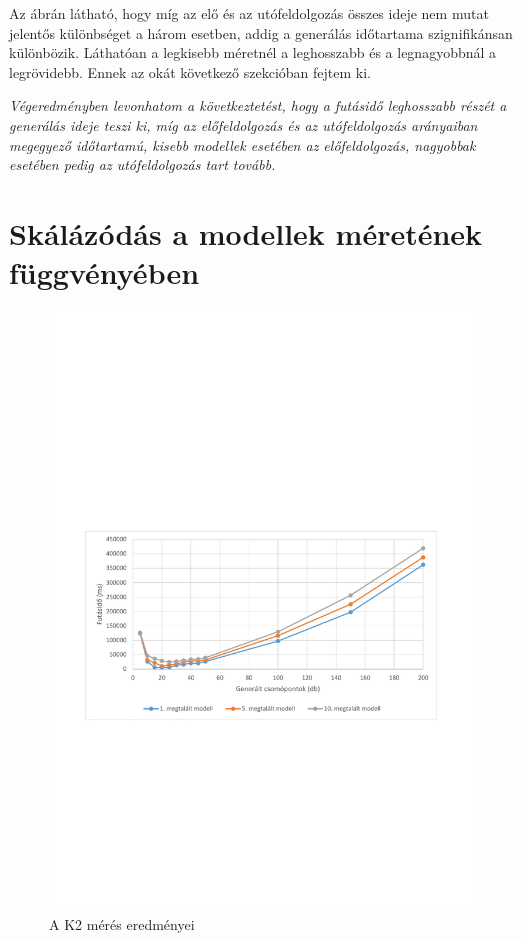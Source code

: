 Az ábrán látható, hogy míg az elő és az utófeldolgozás összes ideje nem mutat jelentős különbséget a három esetben, addig a generálás időtartama szignifikánsan különbözik. Láthatóan a legkisebb méretnél a leghosszabb és a legnagyobbnál a legrövidebb. Ennek az okát következő szekcióban fejtem ki.

\textit{Végeredményben levonhatom a következtetést, hogy a futásidő leghosszabb részét a generálás ideje teszi ki, míg az előfeldolgozás és az utófeldolgozás arányaiban megegyező időtartamú, kisebb modellek esetében az előfeldolgozás, nagyobbak esetében pedig az utófeldolgozás tart tovább.}   

\section{Skálázódás a modellek méretének függvényében}

\begin{figure}
	\centering
	\includegraphics[width=1\textwidth]{figures/statisticsPlottal1}
	\caption{A K2 mérés eredményei}
	\label{fig:BmeresEredmeny}
\end{figure}

